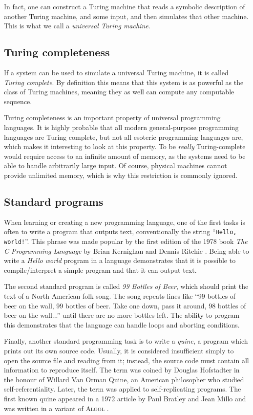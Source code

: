 \documentclass{sig-alternate}
\begin{document}
In fact, one can construct a Turing machine that reads a symbolic description of another Turing machine, and some input, and then simulates that other machine. This is what we call a \emph{universal Turing machine}.

\subsection{Turing completeness}

If a system can be used to simulate a universal Turing machine, it is called \emph{Turing complete}. By definition this means that this system is as powerful as the class of Turing machines, meaning they as well can compute any computable sequence.

Turing completeness is an important property of universal programming languages. It is highly probable that all modern general-purpose programming languages are Turing complete, but not all esoteric programming languages are, which makes it interesting to look at this property. To be \emph{really} Turing-complete would require access to an infinite amount of memory, as the systems need to be able to handle arbitrarily large input. Of course, physical machines cannot provide unlimited memory, which is why this restriction is commonly ignored.

\subsection{Standard programs}

When learning or creating a new programming language, one of the first tasks is often to write a program that outputs text, conventionally the string “\texttt{Hello, world!}”. This phrase was made popular by the first edition of the 1978 book \emph{The C Programming Language} by Brian Kernighan and Dennis Ritchie \cite{kernighan1978c}. Being able to write a \emph{Hello world} program in a language demonstrates that it is possible to compile/interpret a simple program and that it can output text.

The second standard program is called \emph{99 Bottles of Beer}, which should print the text of a North American folk song. The song repeats lines like “99 bottles of beer on the wall, 99 bottles of beer. Take one down, pass it around, 98 bottles of beer on the wall...” until there are no more bottles left. The ability to program this demonstrates that the language can handle loops and aborting conditions.

Finally, another standard programming task is to write a \emph{quine}, a program which prints out its own source code. Usually, it is considered insufficient simply to open the source file and reading from it; instead, the source code must contain all information to reproduce itself. The term was coined by Douglas Hofstadter \cite{hofstadter1979godel} in the honour of Willard Van Orman Quine, an American philosopher who studied self-referentiality. Later, the term was applied to self-replicating programs. The first known quine appeared in a 1972 article by Paul Bratley and Jean Millo and was written in a variant of \textsc{Algol} \cite{bratley1972computer}.
\end{document}
